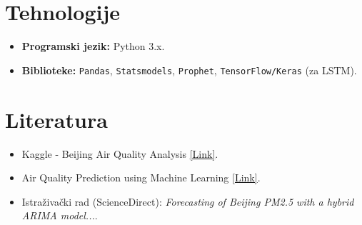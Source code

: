 \documentclass[12pt]{article}
\begin{document}
	\section{Tehnologije}
	\begin{itemize}
		\item \textbf{Programski jezik:} Python 3.x.
		\item \textbf{Biblioteke:} \texttt{Pandas}, \texttt{Statsmodels}, \texttt{Prophet}, \texttt{TensorFlow/Keras} (za LSTM).
	\end{itemize}
	
	\section{Literatura}
	\begin{itemize}
		\item Kaggle - Beijing Air Quality Analysis \href{https://www.kaggle.com/datasets/sid321axn/beijing-multisite-airquality-data-set}{[Link]}.
		\item Air Quality Prediction using Machine Learning \href{https://github.com/topics/air-quality-prediction}{[Link]}.
		\item Istraživački rad (ScienceDirect): \textit{Forecasting of Beijing PM2.5 with a hybrid ARIMA model...}.
	\end{itemize}
	
	
\end{document}
